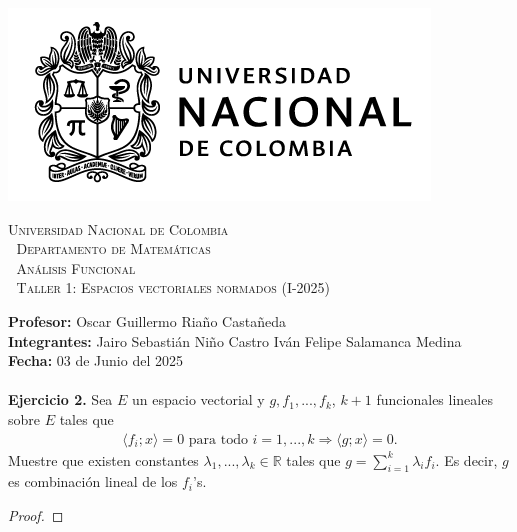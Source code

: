 \thispagestyle{empty}

\begin{minipage}{0.3\textwidth}
  \includegraphics[scale=0.35]{logounal.png}
\end{minipage}%
\hfill
\begin{minipage}{0.65\textwidth}
  \begin{center}
    \scshape
    \Large \textsc{Universidad Nacional de Colombia} \\
    \textcolor{white}{\tiny.} \Large \textsc{Departamento de Matemáticas} \\
    \textcolor{white}{\tiny.} \large \textsc{Análisis Funcional} \\
    \textcolor{white}{\tiny.} \large \textsf{Taller 1: Espacios vectoriales normados} \normalsize (I-2025)
  \end{center}
\end{minipage}

\vspace{0.3cm}
\normalfont

\textbf{Profesor:} Oscar Guillermo Riaño Castañeda\\
\textbf{Integrantes:} Jairo Sebastián Niño Castro\hspace{2.8cm}
Iván Felipe Salamanca Medina\\
\hspace*{2.1cm}\hspace{2.25cm}\textbf{Fecha:} 03 de Junio del 2025\\
\vspace{0.25cm}\\


\textbf{Ejercicio 2.} Sea $E$ un espacio vectorial y $g,f_1,...,f_k$, $k+1$ funcionales lineales sobre $E$ tales que
\begin{align*}
    \langle f_i;x\rangle=0 \text{ para todo } i=1,...,k \Longrightarrow \langle g;x\rangle=0.
\end{align*}
Muestre que existen constantes $\lambda_1,...,\lambda_k\in \mathbb{R}$ tales que $\displaystyle g=\sum_{i=1}^k \lambda_if_i$. Es decir, $g$ es combinación lineal de los $f_i$'s.
\begin{proof}
    
\end{proof}

